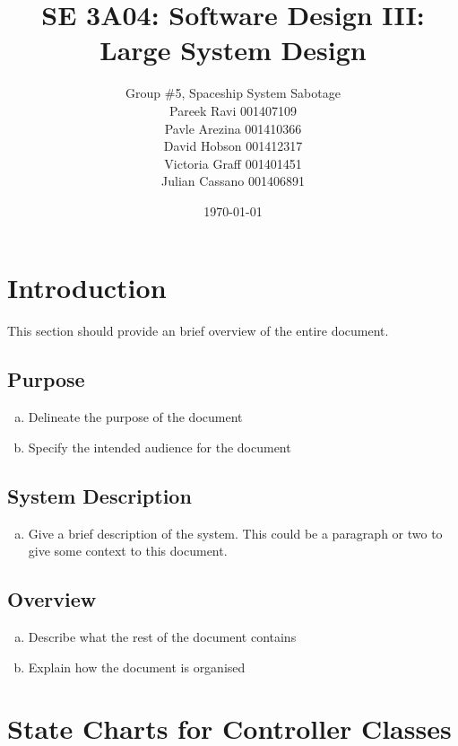 \documentclass[12pt, titlepage]{article}
\title{SE 3A04: Software Design III: Large System Design}
\author{Group \#5, Spaceship System Sabotage %
		\\Pareek Ravi 001407109
		\\Pavle Arezina 001410366
		\\David Hobson 001412317
		\\Victoria Graff 001401451
		\\Julian Cassano 001406891
}
\date{\today}
\begin{document}
\maketitle	
{}
\tableofcontents
\listoftables
\listoffigures
\newpage

\section{Introduction}
\label{sec:introduction}

This section should provide an brief overview of the entire document.

\subsection{Purpose}
\label{sub:purpose}
\begin{enumerate}[a)]
	\item Delineate the purpose of the document
	\item Specify the intended audience for the document
\end{enumerate}

\subsection{System Description}
\label{sub:system_description}
\begin{enumerate}[a)]
	\item Give a brief description of the system. This could be a paragraph or two to give some context to this document.
\end{enumerate}

\subsection{Overview}
\label{sub:overview}
\begin{enumerate}[a)]
	\item Describe what the rest of the document contains 
	\item Explain how the document is organised
\end{enumerate}



\section{State Charts for Controller Classes}
\label{sec:state_charts_for_controller_classes}
\end{document}
